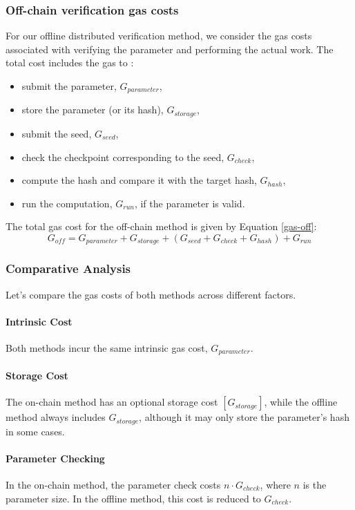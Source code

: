 \documentclass[runningheads]{llncs}
\begin{document}
\subsubsection{Off-chain verification gas costs}
For our offline distributed verification method, we consider the gas costs associated with verifying the parameter and performing the actual work. The total cost includes the gas to :
\begin{itemize}
    \item submit the parameter, \( G_{parameter} \),
    \item store the parameter (or its hash), \( G_{storage} \),
    \item submit the seed, \( G_{seed} \),
    \item check the checkpoint corresponding to the seed, \( G_{check} \),
    \item compute the hash and compare it with the target hash, \( G_{hash} \),
    \item run the computation, \( G_{run} \), if the parameter is valid.
\end{itemize}
The total gas cost for the off-chain method is given by Equation \ref{gas-off}:
\begin{equation}
\label{gas-off}
G_{off} = G_{parameter} + G_{storage} + (G_{seed} + G_{check} + G_{hash}) + G_{run}
\end{equation}
\subsubsection{Comparative Analysis}
Let's compare the gas costs of both methods across different factors.

\paragraph*{Intrinsic Cost} Both methods incur the same intrinsic gas cost, \( G_{parameter} \).

\paragraph*{Storage Cost} The on-chain method has an optional storage cost \( [G_{storage}] \), while the offline method always includes \( G_{storage} \), although it may only store the parameter’s hash in some cases.

\paragraph*{Parameter Checking} In the on-chain method, the parameter check costs \( n \cdot G_{check} \), where \( n \) is the parameter size. In the offline method, this cost is reduced to \( G_{check} \).
\end{document}
